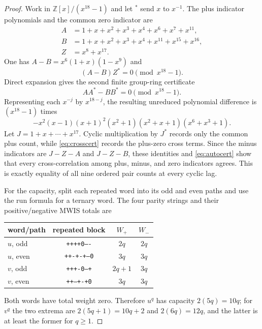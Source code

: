 \documentclass[11pt]{article}
\begin{document}
\begin{proof}
Work in $\mathbb Z[x]/(x^{18}-1)$ and let $^*$ send $x$ to $x^{-1}$.  The plus
indicator polynomials and the common zero indicator are
\begin{align*}
 A&=1+x+x^2+x^3+x^4+x^6+x^7+x^{11},\\
 B&=1+x+x^2+x^3+x^4+x^{11}+x^{15}+x^{16},\\
 Z&=x^8+x^{17}.
\end{align*}
One has $A-B=x^6(1+x)(1-x^9)$ and
\begin{equation}
 (A-B)Z^*=0\pmod{x^{18}-1}.
 \label{eq:crosscert}
\end{equation}
Direct expansion gives the second finite group-ring certificate
\begin{equation}
 AA^*-BB^*=0\pmod{x^{18}-1}.
 \label{eq:autocert}
\end{equation}
Representing each $x^{-j}$ by $x^{18-j}$, the resulting unreduced
polynomial difference is $(x^{18}-1)$ times
\[
 -x^2(x-1)(x+1)^2(x^2+1)(x^2+x+1)(x^6+x^3+1).
\]
Let $J=1+x+\cdots+x^{17}$.  Cyclic multiplication by $J^*$ records only the
common plus count, while \eqref{eq:crosscert} records the plus-zero cross
terms.  Since the minus indicators are $J-Z-A$ and $J-Z-B$, these identities
and \eqref{eq:autocert} show that every cross-correlation among plus, minus,
and zero indicators agrees.
This is exactly equality of all nine ordered pair counts at every cyclic lag.

For the capacity, split each repeated word into its odd and even paths and
use the run formula for a ternary word.  The four parity strings and their
positive/negative MWIS totals are
\begin{center}
\begin{tabular}{@{}lccc@{}}
\toprule
word/path & repeated block & $W_+$ & $W_-$\\
\midrule
$u$, odd & \texttt{++++0----} & $2q$ & $2q$\\
$u$, even & \texttt{++-+-+--0} & $3q$ & $3q$\\
$v$, odd & \texttt{+++-0---+} & $2q+1$ & $3q$\\
$v$, even & \texttt{++---+-+0} & $3q$ & $3q$\\
\bottomrule
\end{tabular}
\end{center}
Both words have total weight zero.  Therefore $u^q$ has capacity $2(5q)=10q$;
for $v^q$ the two extrema are $2(5q+1)=10q+2$ and $2(6q)=12q$, and the latter
is at least the former for $q\geq1$.
\end{proof}
\end{document}
